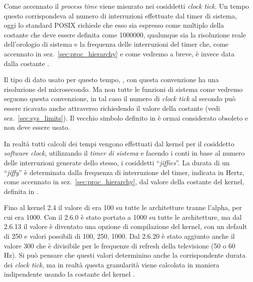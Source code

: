 
Come accennato il \textit{process time} viene misurato nei cosiddetti
\textit{clock tick}. Un tempo questo corrispondeva al numero di interruzioni
effettuate dal timer di sistema, oggi lo standard POSIX richiede che esso sia
espresso come multiplo della costante  che deve
essere definita come 1000000, qualunque sia la risoluzione reale dell'orologio
di sistema e la frequenza delle interruzioni del timer che, come accennato in
sez.~\ref{sec:proc_hierarchy} e come vedremo a breve, è invece data dalla
costante .

Il tipo di dato usato per questo tempo, , con questa
convenzione ha una risoluzione del microsecondo. Ma non tutte le funzioni di
sistema come vedremo seguono questa convenzione, in tal caso il numero di
\textit{clock tick} al secondo può essere ricavato anche attraverso
 richiedendo il valore della costante 
(vedi sez.~\ref{sec:sys_limits}).  Il vecchio simbolo 
definito in  è ormai considerato obsoleto e non deve essere
usato.


In realtà tutti calcoli dei tempi vengono effettuati dal kernel per il
cosiddetto \textit{software clock}, utilizzando il \textit{timer di sistema} e
facendo i conti in base al numero delle interruzioni generate dello stesso, i
cosiddetti  ``\textit{jiffies}''. La durata di un
``\textit{jiffy}'' è determinata dalla frequenza di interruzione del timer,
indicata in Hertz, come accennato in sez.~\ref{sec:proc_hierarchy}, dal valore
della costante  del kernel, definita in .

Fino al kernel 2.4 il valore di  era 100 su tutte le architetture
tranne l'alpha, per cui era 1000. Con il 2.6.0 è stato portato a 1000 su tutte
le architetture, ma dal 2.6.13 il valore è diventato una opzione di
compilazione del kernel, con un default di 250 e valori possibili di 100, 250,
1000. Dal 2.6.20 è stato aggiunto anche il valore 300 che è divisibile per le
frequenze di refresh della televisione (50 o 60 Hz). Si può pensare che questi
valori determinino anche la corrispondente durata dei \textit{clock tick}, ma
in realtà questa granularità viene calcolata in maniera indipendente usando la
costante del kernel .


